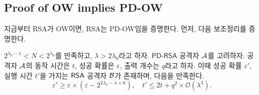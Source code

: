

\subsection{Proof of OW implies PD-OW}

\newcommand{\PDRSA}{\textsf{PD-RSA}}

지금부터 RSA가 OW이면, RSA는 PD-OW임을 증명한다. 먼저, 다음 보조정리를 증명한다.

\begin{tcolorbox}[colback=white, sharp corners, boxrule=0.7pt]
    \begin{lemma}
        $2^{\lambda_0 - 1} < N < 2^{\lambda_0}$를 만족하고, $\lambda >
        2\lambda_0$라고 하자. $\PDRSA$ 공격자 $\mathcal{A}$를 고려하자. 공격자 $\mathcal{A}$의
        동작 시간은 $t$, 성공 확률은 $\varepsilon$, 출력 개수는 $q$라고 하자.
        이때 성공 확률 $\varepsilon'$, 실행 시간 $t'$을 가지는 $\textsf{RSA}$ 공격자
        $\mathcal{B}$가 존재하며, 다음을 만족한다.
        $$
            \varepsilon' \geq \varepsilon \times (\varepsilon - 2^{2\lambda_0 - \lambda + 6}), 
            \quad t' \leq 2t + q^2 \times \mathcal{O}(\lambda^3).
        $$
    \end{lemma}
\end{tcolorbox}

